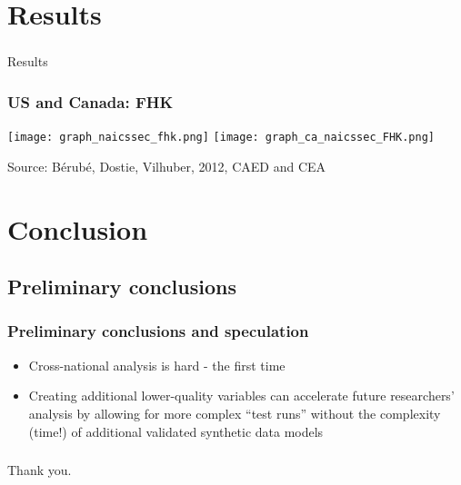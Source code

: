 \section{Results}
\begin{frame}
\frametitle{}
\large{Results}

\end{frame}

\begin{frame}
\frametitle{US and Canada: FHK}
\texttt{[image: graph\_naicssec\_fhk.png]} 
\texttt{[image: graph\_ca\_naicssec\_FHK.png]} 

\tiny{Source: B\'erub\'e, Dostie, Vilhuber, 2012, CAED and CEA}
\end{frame}




%
%
%
\section{Conclusion}
\label{sec:Conclusion}


\subsection{Preliminary conclusions}
\begin{slide}
\frametitle{Preliminary conclusions and speculation}
\begin{itemize}[<+->]
\item Cross-national analysis is hard - {the first time}
\item Creating additional lower-quality variables can accelerate future researchers' analysis by allowing for more complex ``test runs'' without the complexity (time!) of additional validated synthetic data models
\end{itemize}
\end{slide}

\begin{frame}
\frametitle{}
\begin{block}{Thank you.}

\end{block}
\end{frame}